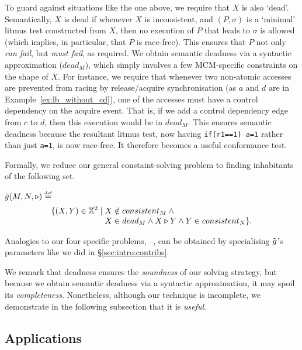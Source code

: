 To guard against situations like the one above, we require that $X$ is
also `dead'. Semantically, $X$ is dead if whenever $X$ is
inconsistent, and $(P,\sigma)$ is a `minimal' litmus test constructed
from $X$, then no execution of $P$ that leads to $\sigma$ is allowed
(which implies, in particular, that $P$ is race-free). This ensures
that $P$ not only \emph{can fail}, but \emph{must fail}, as
required. We obtain semantic deadness via a syntactic approximation
($dead_M$), which simply involves a few MCM-specific constraints on
the shape of $X$. For instance, we require that whenever two
non-atomic accesses are prevented from racing by release/acquire
synchronisation (as $a$ and $d$ are in
Example~\ref{ex:lb_without_cd}), one of the accesses must have a
control dependency on the acquire event. That is, if we add a control
dependency edge from $c$ to $d$, then this execution would be in
$dead_M$. This ensures semantic deadness because the resultant litmus
test, now having \texttt{if(r1==1) a=1} rather than just \texttt{a=1},
is now race-free. It therefore becomes a useful conformance test.


Formally, we reduce our general constaint-solving problem to finding
inhabitants of the following set.
%
\begin{definition}
\label{def:general_problem_executions}
$\GeneralExec(M,N,\triangleright) \eqdef {}$
\[
\{(X,Y)\in\Exec^2\mid 
\stack{X \notin consistent_{M} \wedge {}\\ X \in dead_{M} \wedge
X \triangleright Y \wedge Y \in consistent_{N}\}.}
\] 
\end{definition}

Analogies to our four specific problems, --, can be obtained by
specialising $\tilde{g}$'s parameters like we did in
\S\ref{sec:intro:contribs}.

We remark that deadness ensures the \emph{soundness} of our solving
strategy, but because we obtain semantic deadness via a syntactic
approximation, it may spoil its
\emph{completeness}. Nonetheless, although our technique is
incomplete, we demonstrate in the following subsection that it is
\emph{useful}.

\subsection{Applications}
\label{sec:applications}

